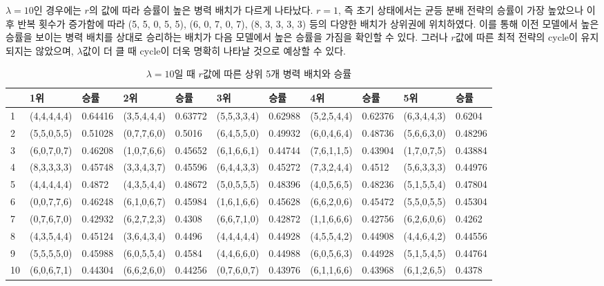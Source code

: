 $\lambda=10$인 경우에는 $r$의 값에 따라 승률이 높은 병력 배치가 다르게 나타났다. $r=1$, 즉 초기 상태에서는 균등 분배 전략의 승률이 가장 높았으나 이후 반복 횟수가 증가함에 따라 (5, 5, 0, 5, 5), (6, 0, 7, 0, 7), (8, 3, 3, 3, 3) 등의 다양한 배치가 상위권에 위치하였다. 이를 통해 이전 모델에서 높은 승률을 보이는 병력 배치를 상대로 승리하는 배치가 다음 모델에서 높은 승률을 가짐을 확인할 수 있다. 그러나 $r$값에 따른 최적 전략의 cycle이 유지되지는 않았으며, $\lambda$값이 더 클 때 cycle이 더욱 명확히 나타날 것으로 예상할 수 있다.
\vspace{9em}
\begin{table}[htb!]
    \centering
    \caption{$\lambda = 10$일 때 $r$값에 따른 상위 5개 병력 배치와 승률}
    {\scriptsize
    \begin{tabular}{l|ll|ll|ll|ll|ll}
       & 1위       & 승률      & 2위       & 승률      & 3위       & 승률      & 4위       & 승률      & 5위       & 승률      \\ \hline
    1  & (4,4,4,4,4) & 0.64416 & (3,5,4,4,4) & 0.63772 & (5,5,3,3,4) & 0.62988 & (5,2,5,4,4) & 0.62376 & (6,3,4,4,3) & 0.6204  \\
    2  & (5,5,0,5,5) & 0.51028 & (0,7,7,6,0) & 0.5016  & (6,4,5,5,0) & 0.49932 & (6,0,4,6,4) & 0.48736 & (5,6,6,3,0) & 0.48296 \\
    3  & (6,0,7,0,7) & 0.46208 & (1,0,7,6,6) & 0.45652 & (6,1,6,6,1) & 0.44744 & (7,6,1,1,5) & 0.43904 & (1,7,0,7,5) & 0.43884 \\
    4  & (8,3,3,3,3) & 0.45748 & (3,3,4,3,7) & 0.45596 & (6,4,4,3,3) & 0.45272 & (7,3,2,4,4) & 0.4512  & (5,6,3,3,3) & 0.44976 \\
    5  & (4,4,4,4,4) & 0.4872  & (4,3,5,4,4) & 0.48672 & (5,0,5,5,5) & 0.48396 & (4,0,5,6,5) & 0.48236 & (5,1,5,5,4) & 0.47804 \\
    6  & (0,0,7,7,6) & 0.46248 & (6,1,0,6,7) & 0.45984 & (1,6,1,6,6) & 0.45628 & (6,6,2,0,6) & 0.45472 & (5,5,0,5,5) & 0.45304 \\
    7  & (0,7,6,7,0) & 0.42932 & (6,2,7,2,3) & 0.4308  & (6,6,7,1,0) & 0.42872 & (1,1,6,6,6) & 0.42756 & (6,2,6,0,6) & 0.4262  \\
    8  & (4,3,5,4,4) & 0.45124 & (3,6,4,3,4) & 0.4496  & (4,4,4,4,4) & 0.44928 & (4,5,5,4,2) & 0.44908 & (4,4,6,4,2) & 0.44556 \\
    9  & (5,5,5,5,0) & 0.45988 & (6,0,5,5,4) & 0.4584  & (4,4,6,6,0) & 0.44988 & (6,0,5,6,3) & 0.44928 & (5,1,5,4,5) & 0.44764 \\
    10 & (6,0,6,7,1) & 0.44304 & (6,6,2,6,0) & 0.44256 & (0,7,6,0,7) & 0.43976 & (6,1,1,6,6) & 0.43968 & (6,1,2,6,5) & 0.4378 
    \end{tabular}}
    \label{tab:my_label}
\end{table} 

